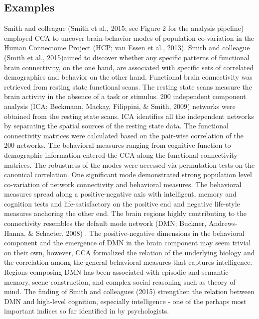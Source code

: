 \subsection{Examples}
Smith and colleague (Smith et al., 2015; see Figure 2 for the analysis pipeline) employed CCA to uncover brain-behavior modes of population co-variation in the Human Connectome Project (HCP; van Essen et al., 2013). Smith and colleague (Smith et al., 2015)aimed to discover whether any specific patterns of functional brain connectivity, on the one hand, are associated with specific sets of correlated demographics and behavior on the other hand. Functional brain connectivity was retrieved from resting state functional scans. The resting state scans measure the brain activity in the absence of a task or stimulus. 200 independent component analysis (ICA; Beckmann, Mackay, Filippini, \& Smith, 2009) networks were obtained from the resting state scans. ICA identifies all the independent networks by separating the spatial sources of the resting state data. The functional connectivity matrices were calculated based on the pair-wise correlation of the 200 networks. The behavioral measures ranging from cognitive function to demographic information entered the CCA along the functional connectivity matrices. The robustness of the modes were accessed via permutation tests on the canonical correlation. One significant mode demonstrated strong population level co-variation of network connectivity and behavioral measures. The behavioral measures spread along a positive-negative axis with intelligent, memory and cognition tests and life-satisfactory on the positive end and negative life-style measures anchoring the other end. The brain regions highly contributing to the connectivity resembles the default mode network  (DMN; Buckner, Andrews-Hanna, \& Schacter, 2008) . The positive-negative dimensions in the behavioral component and the emergence of DMN in the brain component may seem trivial on their own, however, CCA formalized the relation of the underlying biology and the correlation among the general behavioral measures that captures intelligence. Regions composing DMN has been associated with episodic and semantic memory, scene construction, and complex social reasoning such as theory of mind. The finding of Smith and colleagues (2015) strengthen the relation between DMN and high-level cognition, especially intelligence - one of the perhaps most important indices so far identified in by psychologists. 

